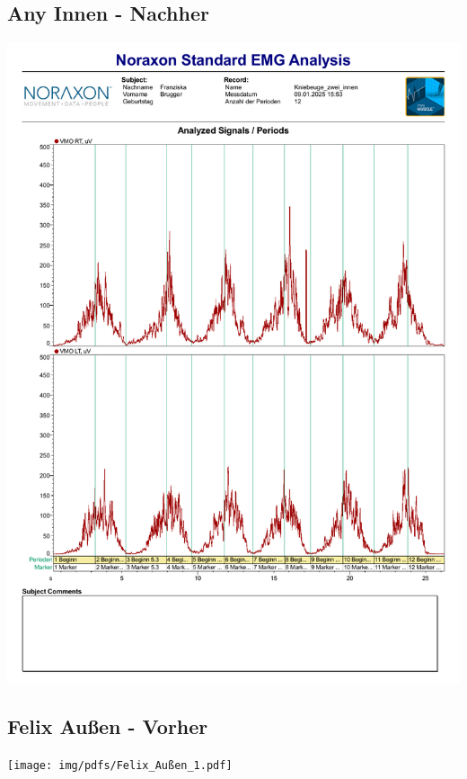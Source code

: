 \subsection*{Any Innen - Nachher}
\includegraphics[width=.9\textwidth]{img/pdfs/Any_2_innen.pdf}
\clearpage

\subsection*{Felix Außen - Vorher}
\texttt{[image: img/pdfs/Felix\_Außen\_1.pdf]}
\clearpage

